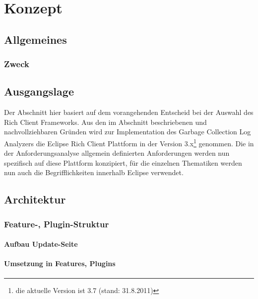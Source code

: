 \chapter{Konzept}
\section{Allgemeines}
\subsection{Zweck}

\section{Ausgangslage}
Der Abschnitt hier basiert auf dem vorangehenden Entscheid bei der Auswahl des Rich Client Frameworks. Aus den im Abschnitt  beschriebenen und nachvollziehbaren Gründen wird zur Implementation des Garbage Collection Log Analyzers die Eclipse Rich Client Plattform in der Version 3.x\footnote{die aktuelle Version ist 3.7 (stand: 31.8.2011)} genommen. Die in der Anforderungsanalyse allgemein definierten Anforderungen werden nun spezifisch auf diese Plattform konzipiert, für die einzelnen Thematiken werden nun auch die Begrifflichkeiten innerhalb Eclipse verwendet.


\section{Architektur}
\subsection{Feature-, Plugin-Struktur}
\subsubsection{Aufbau Update-Seite}


\subsubsection{Umsetzung in Features, Plugins}













